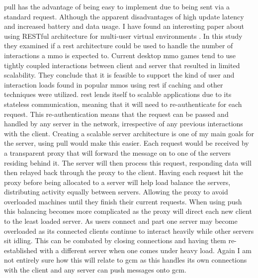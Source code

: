 \documentclass[11pt,fleqn,twoside]{article}
\begin{document}
\gls{pull} has the advantage of being easy to implement due to being sent via a standard request. Although the apparent disadvantages of high update latency and increased battery and data usage. I have found an interesting paper about using RESTful architecture for multi-user virtual environments \cite{6329833}. In this study they examined if a \gls{rest} architecture could be used to handle the number of interactions a \gls{mmo} is expected to. Current desktop \gls{mmo} games tend to use tightly coupled interactions between client and server that resulted in limited scalability. They conclude that it is feasible to support the kind of user and interaction loads found in popular \gls{mmo}s using \gls{rest} if caching and other techniques were utilized. \gls{rest} lends itself to scalable applications due to its stateless communication, meaning that it will need to re-authenticate for each request. This re-authentication means that the request can be passed and handled by any server in the network, irrespective of any previous interactions with the client. Creating a scalable server architecture is one of my main goals for the server, using \gls{pull} would make this easier. Each request would be received by a transparent proxy that will forward the message on to one of the servers residing behind it. The server will then process this request, responding data will then relayed back through the proxy to the client. Having each request hit the proxy before being allocated to a server will help load balance the servers, distributing activity equally between servers. Allowing the proxy to avoid overloaded machines until they finish their current requests. When using \gls{push} this balancing becomes more complicated as the proxy will direct each new client to the least loaded server. As users connect and part one server may become overloaded as its connected clients continue to interact heavily while other servers sit idling. This can be combated by closing connections and having them re-established with a different server when one comes under heavy load. Again I am not entirely sure how this will relate to \gls{gcm} as this handles its own connections with the client and any server can push messages onto \gls{gcm}.
\end{document}
